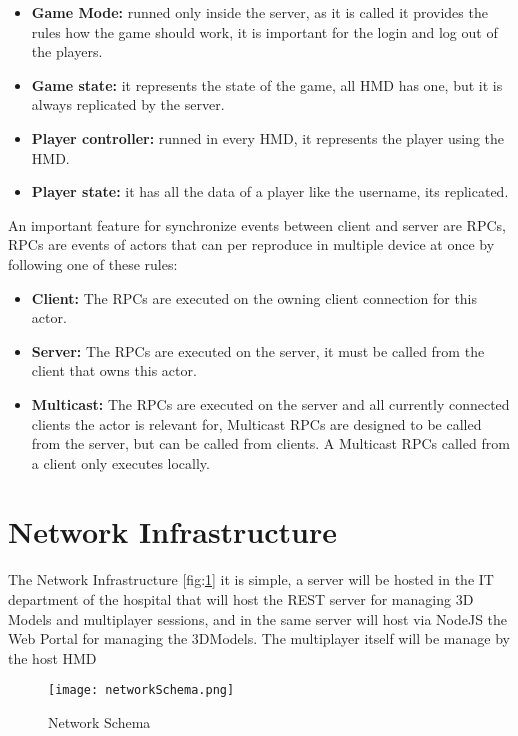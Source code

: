 \begin{itemize}
  \item \textbf{Game Mode:} runned only inside the server, as it is called it provides the rules how the game should work, it is important for the login and log out of the players.
  \item \textbf{Game state:} it represents the state of the game, all \ac{HMD} has one, but it is always replicated by the server.
  \item \textbf{Player controller:} runned in every \ac{HMD}, it represents the player using the \ac{HMD}.
  \item \textbf{Player state:} it has all the data of a player like the username, its replicated.
\end{itemize}
\noindent
An important feature for synchronize events between client and server are \ac{RPCs}, \ac{RPCs} are events of actors that can per reproduce in multiple device at once by following one of these rules:
\begin{itemize}
  \item \textbf{Client:} The \ac{RPCs} are executed on the owning client connection for this actor.
  \item \textbf{Server:} The \ac{RPCs} are executed on the server, it must be called from the client that owns this actor.
  \item \textbf{Multicast:} The \ac{RPCs} are executed on the server and all currently connected clients the actor is relevant for, Multicast \ac{RPCs} are designed to be called from the server, but can be called from clients. A Multicast \ac{RPCs} called from a client only executes locally.
\end{itemize}

\section{Network Infrastructure}
\noindent
The Network Infrastructure [fig:\ref{fig:NetworkSchema}] it is simple, a server will be hosted in the IT department of the hospital that will host the \ac{REST} server for managing 3D Models and multiplayer sessions,
and in the same server will host via NodeJS the Web Portal for managing the 3DModels.
The multiplayer itself will be manage by the host \ac{HMD}

\begin{figure}[h]
  \centering
  \texttt{[image: networkSchema.png]}
  \caption{Network Schema}
  \label{fig:NetworkSchema}
\end{figure}


